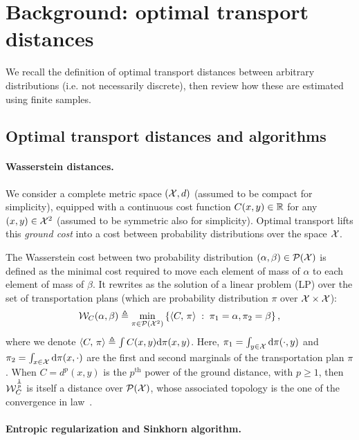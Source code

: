 \section{Background: optimal transport distances}

We recall the definition of optimal transport distances between arbitrary distributions (i.e. not necessarily discrete), then review how these are estimated using finite samples.

\subsection{Optimal transport distances and algorithms}

\paragraph{Wasserstein distances.} 

We consider a complete metric space $(\mathcal{X},d)$ (assumed to be compact for simplicity), equipped
with a continuous cost function $C(x,y) \in \mathbb{R}$ for any $(x,y) \in \mathcal{X}^2$ (assumed to be symmetric also for simplicity). 
%
Optimal transport lifts this \textit{ground cost} into a cost between probability
distributions over the space $\mathcal{X}$. 
%

The Wasserstein cost between two probability distribution $(\alpha, \beta) \in \mathcal{P}(\mathcal{X})$ is defined as the minimal cost required to move each element of mass of $\alpha$ to each element of mass of $\beta$. It rewrites as the solution of a
linear problem (LP) over the set of transportation plans (which are probability distribution $\pi$ over $\mathcal{X} \times \mathcal{X}$):
\begin{equation}\label{eq:wass}
    \mathcal{W}_C(\alpha, \beta) \triangleq 
    \min_{\pi \in \mathcal{P}(\mathcal{X}^2)}
    \left\{ 
    	\langle C,\,\pi\rangle
	 \;:\;  \pi_1=\alpha, \pi_2=\beta \right\},
\end{equation}
where we denote $\langle C,\,\pi\rangle \triangleq \int C(x,y) \textrm{d}\pi(x,y)$. Here,  
$\pi_1 = \int_{y\in \mathcal{X}} \textrm{d} \pi(\cdot, y)$ and $\pi_2 = \int_{x\in \mathcal{X}} \textrm{d}
\pi(x, \cdot)$ are the first and second marginals of the transportation plan $\pi$. 
%
When $C=d^p(x,y)$ is the $p^{\text{th}}$ power of the ground distance, with $p \geq 1$, then $\mathcal{W}_C^{\frac{1}{p}}$ is itself a distance over $\mathcal{P}(\mathcal{X})$, whose associated topology is the one of the convergence in law~\cite{santambrogio2015optimal}.

\paragraph{Entropic regularization and Sinkhorn algorithm.} 

